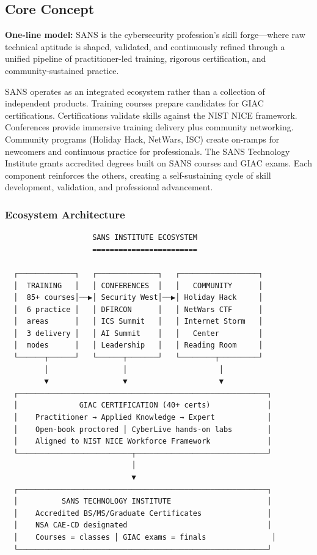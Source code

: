 \documentclass[11pt,letterpaper]{article}
\begin{document}
\subsection{Core Concept}

\begin{quotebox}
\textbf{One-line model:} SANS is the cybersecurity profession's skill forge---where raw technical aptitude is shaped, validated, and continuously refined through a unified pipeline of practitioner-led training, rigorous certification, and community-sustained practice.
\end{quotebox}

SANS operates as an integrated ecosystem rather than a collection of independent products. Training courses prepare candidates for GIAC certifications. Certifications validate skills against the NIST NICE framework. Conferences provide immersive training delivery plus community networking. Community programs (Holiday Hack, NetWars, ISC) create on-ramps for newcomers and continuous practice for professionals. The SANS Technology Institute grants accredited degrees built on SANS courses and GIAC exams. Each component reinforces the others, creating a self-sustaining cycle of skill development, validation, and professional advancement.

\subsubsection{Ecosystem Architecture}

\begin{asciibox}
\begin{verbatim}
                    SANS INSTITUTE ECOSYSTEM
                    ========================

  ┌─────────────┐   ┌──────────────┐   ┌──────────────────┐
  │  TRAINING   │   │ CONFERENCES  │   │   COMMUNITY      │
  │  85+ courses│──▶│ Security West│──▶│ Holiday Hack     │
  │  6 practice │   │ DFIRCON      │   │ NetWars CTF      │
  │  areas      │   │ ICS Summit   │   │ Internet Storm   │
  │  3 delivery │   │ AI Summit    │   │   Center         │
  │  modes      │   │ Leadership   │   │ Reading Room     │
  └──────┬──────┘   └──────┬───────┘   └────────┬─────────┘
         │                 │                     │
         ▼                 ▼                     ▼
  ┌─────────────────────────────────────────────────────────┐
  │              GIAC CERTIFICATION (40+ certs)             │
  │    Practitioner → Applied Knowledge → Expert            │
  │    Open-book proctored │ CyberLive hands-on labs        │
  │    Aligned to NIST NICE Workforce Framework             │
  └──────────────────────────┬──────────────────────────────┘
                             │
                             ▼
  ┌─────────────────────────────────────────────────────────┐
  │          SANS TECHNOLOGY INSTITUTE                      │
  │    Accredited BS/MS/Graduate Certificates               │
  │    NSA CAE-CD designated                                │
  │    Courses = classes │ GIAC exams = finals               │
  └─────────────────────────────────────────────────────────┘
\end{verbatim}
\end{asciibox}
\end{document}
